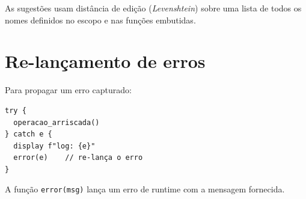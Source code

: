 As sugestões usam distância de edição (\textit{Levenshtein}) sobre uma lista de
todos os nomes definidos no escopo e nas funções embutidas.

\section{Re-lançamento de erros}

Para propagar um erro capturado:

\begin{lstlisting}
try {
  operacao_arriscada()
} catch e {
  display f"log: {e}"
  error(e)    // re-lança o erro
}
\end{lstlisting}

A função \lstinline{error(msg)} lança um erro de runtime com a mensagem fornecida.
